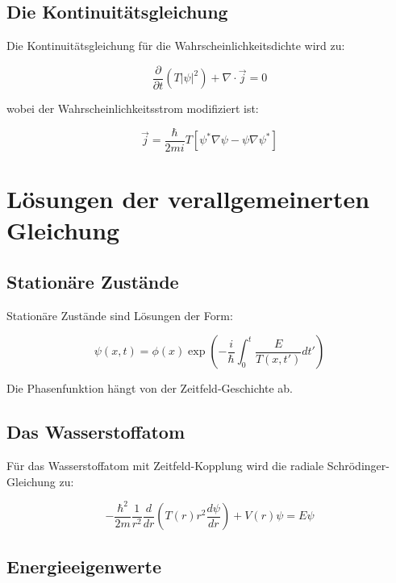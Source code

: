 \documentclass[12pt,a4paper]{report}
\begin{document}
\subsection{Die Kontinuitätsgleichung}

Die Kontinuitätsgleichung für die Wahrscheinlichkeitsdichte wird zu:

\begin{equation}
	\frac{\partial}{\partial t}(T|\psi|^2) + \nabla \cdot \vec{j} = 0
\end{equation}

wobei der Wahrscheinlichkeitsstrom modifiziert ist:

\begin{equation}
	\vec{j} = \frac{\hbar}{2mi}T[\psi^*\nabla\psi - \psi\nabla\psi^*]
\end{equation}

\section{Lösungen der verallgemeinerten Gleichung}

\subsection{Stationäre Zustände}

Stationäre Zustände sind Lösungen der Form:

\begin{equation}
	\psi(x,t) = \phi(x) \exp\left(-\frac{i}{\hbar}\int_0^t \frac{E}{T(x,t')} dt'\right)
\end{equation}

Die Phasenfunktion hängt von der Zeitfeld-Geschichte ab.

\subsection{Das Wasserstoffatom}

Für das Wasserstoffatom mit Zeitfeld-Kopplung wird die radiale Schrödinger-Gleichung zu:

\begin{equation}
	-\frac{\hbar^2}{2m}\frac{1}{r^2}\frac{d}{dr}\left(T(r)r^2\frac{d\psi}{dr}\right) + V(r)\psi = E\psi
\end{equation}

\subsection{Energieeigenwerte}
\end{document}
